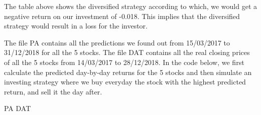\documentclass[
  11pt,
]{article}
\newenvironment{Shaded}{\begin{snugshade}}{\end{snugshade}}
\newcommand{\NormalTok}[1]{#1}
\begin{document}
The table above shows the diversified strategy according to which, we
would get a negative return on our investment of -0.018. This implies
that the diversified strategy would result in a loss for the investor.

The file PA contains all the predictions we found out from 15/03/2017 to
31/12/2018 for all the 5 stocks. The file DAT contains all the real
closing prices of all the 5 stocks from 14/03/2017 to 28/12/2018. In the
code below, we first calculate the predicted day-by-day returns for the
5 stocks and then simulate an investing strategy where we buy everyday
the stock with the highest predicted return, and sell it the day after.

\begin{Shaded}
\begin{Highlighting}[]
\NormalTok{PA}
\NormalTok{DAT}


\end{Highlighting}
\end{Shaded}
\end{document}
